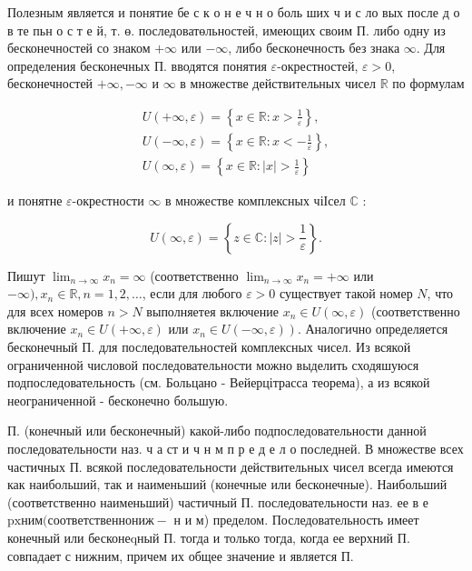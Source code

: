 \documentclass[10pt]{article}
\begin{document}
Полезным является и понятие бе с к о н е ч н о боль ших ч и с ло вых после д о в те пьн о с т е й, т. ө. последоватөльностей, имеющих своим П. либо одну из бесконечностей со знаком $+\infty$ или $-\infty$, либо бесконечность без знака $\infty$. Для определения бесконечных П. вводятся понятия $\varepsilon$-окрестностей, $\varepsilon>0$, бесконечностей $+\infty,-\infty$ и $\infty$ в множестве действительных чисел $\mathbb{R}$ по формулам



\[

\begin{gathered}

U(+\infty, \varepsilon)=\left\{x \in \mathbb{R}: x>\frac{1}{\varepsilon}\right\}, \\

U(-\infty, \varepsilon)=\left\{x \in \mathbb{R}: x<-\frac{1}{\varepsilon}\right\}, \\

U(\infty, \varepsilon)=\left\{x \in \mathbb{R}:|x|>\frac{1}{\varepsilon}\right\}

\end{gathered}

\]



и понятне $\varepsilon$-окрестности $\infty$ в множестве комплексных чіІсел $\mathbb{C}$ :



\[

U(\infty, \varepsilon)=\left\{z \in \mathbb{C}:|z|>\frac{1}{\varepsilon}\right\} .

\]



Пишут $\lim _{n \rightarrow \infty} x_{n}=\infty$ (соответственно $\lim _{n \rightarrow \infty} x_{n}=+\infty$ или $-\infty), x_{n} \in \mathbb{R}, n=1,2, \ldots$, если для любого $\varepsilon>0$ существует такой номер $N$, что для всех номеров $n>N$ выполняетея включение $x_{n} \in U(\infty, \varepsilon)$ (соответственно включение $x_{n} \in U(+\infty, \varepsilon)$ или $\left.x_{n} \in U(-\infty, \varepsilon)\right)$. Аналогично определяется бесконечный П. для последовательностей комплексных чисел. Из всякой ограниченной числовой последовательности можно выделить сходяшуюся подпоследовательность (см. Больцано - Вейерцітрасса теорема), а из всякой неограниченной - бесконечно большую.



П. (конечный или бесконечный) какой-либо подпоследовательности данной последовательности наз. ч а ст и ч н м п р е д е л о последней. В множестве всех частичных П. всякой последовательности действительных чисел всегда имеются как наибольший, так и наименьший (конечные или бесконечные). Наибольший (соответственно наименьший) частичный П. последовательности наз. ее в е $\mathrm{p} \mathrm{x} \mathrm{н} \mathrm{и} \mathrm{м} \mathrm{(соответственно} \mathrm{н} \mathrm{и} \mathrm{ж-}$ н и м) пределом. Последовательность имеет конечный или бесконеqный П. тогда и только тогда, когда ее верхний П. совпадает с нижним, причем их общее значение и является П.
\end{document}
